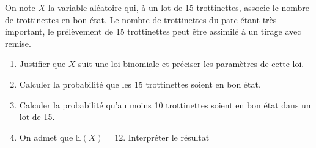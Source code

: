 On note $X$ la variable aléatoire qui, à un lot de 15 trottinettes, associe le nombre de trottinettes en bon état. Le nombre de trottinettes du parc étant très important, le prélèvement de 15 trottinettes peut être assimilé à un tirage avec remise.

\begin{enumerate}
	\item Justifier que $X$ suit une loi binomiale et préciser les paramètres de cette loi.
	\item Calculer la probabilité que les 15 trottinettes soient en bon état.
	\item Calculer la probabilité qu'au moins 10 trottinettes soient en bon état dans un lot de 15.
	\item On admet que $\mathbb{E}(X) = 12$. Interpréter le résultat 
\end{enumerate}
